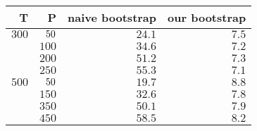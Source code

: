 \begin{tabular}{rrrr}
  \toprule T & P & naive bootstrap & our bootstrap \\ 
  \midrule $300$ & $\enskip50$ & $24.1$ & $7.5$ \\ 
   & $100$ & $34.6$ & $7.2$ \\ 
   & $200$ & $51.2$ & $7.3$ \\ 
   & $250$ & $55.3$ & $7.1$ \\ 
  $500$ & $\enskip50$ & $19.7$ & $8.8$ \\ 
   & $150$ & $32.6$ & $7.8$ \\ 
   & $350$ & $50.1$ & $7.9$ \\ 
   & $450$ & $58.5$ & $8.2$ \\ 
   \bottomrule \end{tabular}
